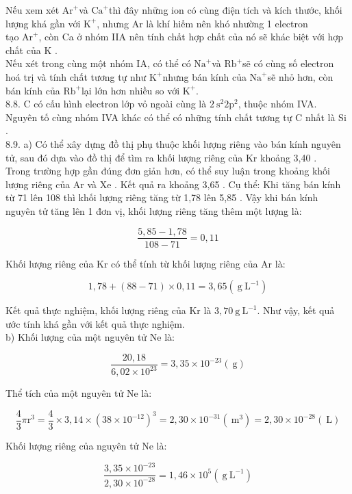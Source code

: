 \documentclass[10pt]{article}
\begin{document}
Nếu xem xét $\mathrm{Ar}^{+}$và $\mathrm{Ca}^{+}$thì đây những ion có cùng điện tích và kích thước, khối lượng khá gần với $\mathrm{K}^{+}$, nhưng Ar là khí hiếm nên khó nhường 1 electron\\
tạo $\mathrm{Ar}^{+}$, còn Ca ở nhóm IIA nên tính chất hợp chất của nó sẽ khác biệt với hợp chất của K .\\
Nếu xét trong cùng một nhóm IA, có thể có $\mathrm{Na}^{+}$và $\mathrm{Rb}^{+}$sẽ có cùng số electron hoá trị và tính chất tương tự như $\mathrm{K}^{+}$nhưng bán kính của $\mathrm{Na}^{+}$sẽ nhỏ hơn, còn bán kính của $\mathrm{Rb}^{+}$lại lớn hơn nhiều so với $\mathrm{K}^{+}$.\\
8.8. C có cấu hình electron lớp vỏ ngoài cùng là $2 \mathrm{~s}^{2} 2 \mathrm{p}^{2}$, thuộc nhóm IVA. Nguyên tố cùng nhóm IVA khác có thể có những tính chất tương tự C nhất là Si .\\
8.9. a) Có thể xây dựng đồ thị phụ thuộc khối lượng riêng vào bán kính nguyên tử, sau đó dựa vào đồ thị để tìm ra khối lượng riêng của Kr khoảng 3,40 .\\
Trong trường hợp gần đúng đơn giản hơn, có thể suy luận trong khoảng khối lượng riêng của Ar và Xe . Kết quả ra khoảng 3,65 . Cụ thể: Khi tăng bán kính từ 71 lên 108 thì khối lượng riêng tăng từ 1,78 lên 5,85 . Vậy khi bán kính nguyên tử tăng lên 1 đơn vị, khối lượng riêng tăng thêm một lượng là:

$$
\frac{5,85-1,78}{108-71}=0,11
$$

Khối lượng riêng của Kr có thể tính từ khối lượng riêng của Ar là:

$$
1,78+(88-71) \times 0,11=3,65\left(\mathrm{~g} \mathrm{~L}^{-1}\right)
$$

Kết quả thực nghiệm, khối lượng riêng của Kr là $3,70 \mathrm{~g} \mathrm{~L}^{-1}$. Như vậy, kết quả ước tính khá gần với kết quả thực nghiệm.\\
b) Khối lượng của một nguyên tử Ne là:

$$
\frac{20,18}{6,02 \times 10^{23}}=3,35 \times 10^{-23}(\mathrm{~g})
$$

Thể tích của một nguyên tử Ne là:

$$
\frac{4}{3} \pi \mathrm{r}^{3}=\frac{4}{3} \times 3,14 \times\left(38 \times 10^{-12}\right)^{3}=2,30 \times 10^{-31}\left(\mathrm{~m}^{3}\right)=2,30 \times 10^{-28}(\mathrm{~L})
$$

Khối lượng riêng của nguyên tử Ne là:

$$
\frac{3,35 \times 10^{-23}}{2,30 \times 10^{-28}}=1,46 \times 10^{5}\left(\mathrm{~g} \mathrm{~L}^{-1}\right)
$$
\end{document}
